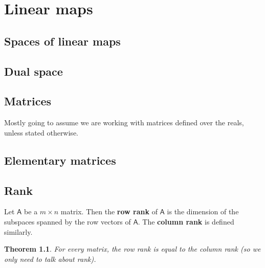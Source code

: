 \documentclass[letter-paper]{tufte-book}
\newtheorem{theorem}{\color{pastel-blue}Theorem}[section]
\newcommand{\As}{{\mathsf{A}}}
\begin{document}

\chapter{Linear maps}


\section{Spaces of linear maps}


\section{Dual space}


\section{Matrices}

Mostly going to assume we are working with matrices defined over the reals,
unless stated otherwise.


\section{Elementary matrices}


\section{Rank}

Let $\As$ be a $m\times n$ matrix. Then the \textbf{row rank} of $\As$ is the
dimension of the subspaces spanned by the row vectors of $\As$. The
\textbf{column rank} is defined similarly.

\begin{theorem}
  For every matrix, the row rank is equal to the column rank (so we only need to
  talk about \emph{rank}).
\end{theorem}
\end{document}
